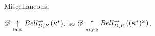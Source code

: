 \documentclass[11pt]{article}
\begin{document}
  \newpage

  Miscellaneous:

  \begin{example}
    $\mathscr{D}\underset{\text{tact}}{\uparrow} Bell_{D,P}^{\rightharpoonup}\left({\kappa^*}\right)$,
    so $\mathscr{D}\underset{\text{mark}}{\uparrow} Bell_{D,P}^{\rightharpoonup}\left({(\kappa^*)^\omega}\right)$.
  \end{example}






\end{document}
